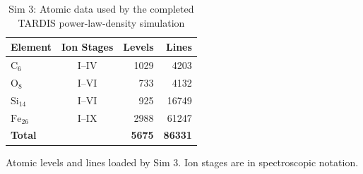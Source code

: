 \documentclass{article}
\begin{document}
\begin{table}[p]
\centering
\caption{Sim 3: Atomic data used by the completed TARDIS power-law-density simulation\label{tab:tardis-sim-3-atomdata}}
\small
\begin{tabular*}{0.9\textwidth}{@{\extracolsep{\fill}}lcrr}
\hline
\textbf{Element} & \textbf{Ion Stages} & \textbf{Levels} & \textbf{Lines} \\
\hline
$\mathrm{C}_{6}$ & I--IV & 1029 & 4203 \\
$\mathrm{O}_{8}$ & I--VI & 733 & 4132 \\
$\mathrm{Si}_{14}$ & I--VI & 925 & 16749 \\
$\mathrm{Fe}_{26}$ & I--IX & 2988 & 61247 \\
\textbf{Total} &  & \textbf{5675} & \textbf{86331} \\
\hline
\end{tabular*}
\medskip
\parbox{0.9\textwidth}{\footnotesize Atomic levels and lines loaded by Sim 3. Ion stages are in spectroscopic notation.}
\end{table}
\end{document}
